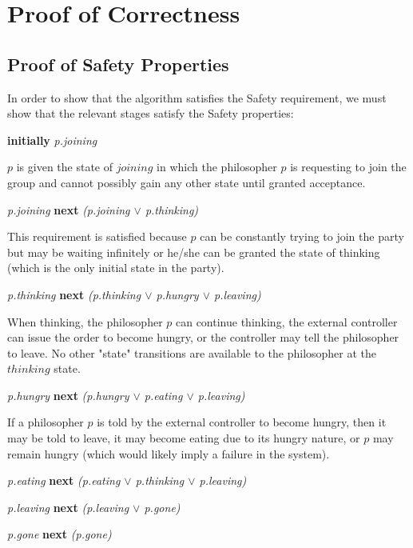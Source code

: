 \documentclass[11pt]{article}
\begin{document}
\section{Proof of Correctness}




\subsection{Proof of Safety Properties}

In order to show that the algorithm satisfies the Safety requirement, we must show that the relevant stages satisfy the Safety properties:

{\bfseries initially} {\it p.joining}

\indent $p$ is given the state of $joining$ in which the philosopher $p$ is requesting to join the group and cannot possibly gain any other state until granted acceptance.

{\it p.joining} {\bfseries next} {\it (p.joining $\vee$ p.thinking)}

\indent This requirement is satisfied because $p$ can be constantly trying to join the party but may be waiting infinitely or he/she can be granted the state of thinking (which is the only initial state in the party).

{\it p.thinking} {\bfseries next} {\it (p.thinking $\vee$ p.hungry $\vee$ p.leaving)}

\indent When thinking, the philosopher $p$ can continue thinking, the external controller can issue the order to become hungry, or the controller may tell the philosopher to leave. No other "state" transitions are available to the philosopher at the $thinking$ state. 

{\it p.hungry} {\bfseries next} {\it (p.hungry $\vee$ p.eating $\vee$ p.leaving)}

\indent If a philosopher $p$ is told by the external controller to become hungry, then it may be told to leave, it may become eating due to its hungry nature, or $p$ may remain hungry (which would likely imply a failure in the system).

{\it p.eating} {\bfseries next} {\it (p.eating $\vee$ p.thinking $\vee$ p.leaving)}

\indent

{\it p.leaving} {\bfseries next} {\it (p.leaving $\vee$ p.gone)}

\indent

{\it p.gone} {\bfseries next} {\it (p.gone)}
\end{document}
